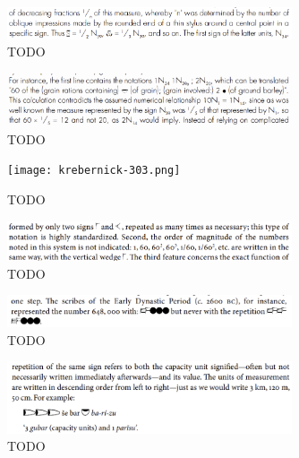 \documentclass[10pt, a4paper, twoside]{article}
\begin{document}
\begin{figure}
  \begin{center}
  \includegraphics[width=0.75\textwidth]{englund-113.png}
  \caption{TODO\label{englund113}}
  \end{center}
\end{figure}
\begin{figure}
  \begin{center}
  \includegraphics[width=0.75\textwidth]{englund-116.png}
  \caption{TODO\label{englund116}}
  \end{center}
\end{figure}
\begin{figure}
  \begin{center}
  \texttt{[image: krebernick-303.png]}
  \caption{TODO\label{krebernick303}}
  \end{center}
\end{figure}
\begin{figure}
  \begin{center}
  \includegraphics[width=0.75\textwidth]{chambon-58.png}
  \caption{TODO\label{chambon58}}
  \end{center}
\end{figure}
\begin{figure}
  \begin{center}
  \includegraphics[width=0.75\textwidth]{chambon-59.png}
  \caption[TODO]{TODO\label{chambon59}\footnotemark}
  \end{center}
\end{figure}
\begin{figure}
  \begin{center}
  \includegraphics[width=0.75\textwidth]{chambon-61.png}
  \caption{TODO\label{chambon61}}
  \end{center}
\end{figure}
\end{document}
